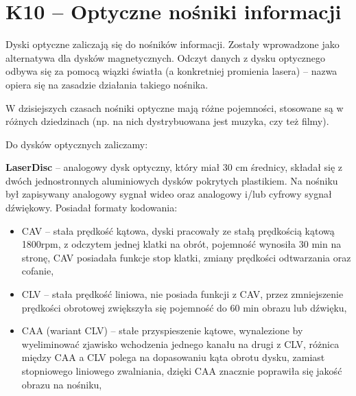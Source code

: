 \sloppy\section{K10 -- Optyczne nośniki informacji}

Dyski optyczne zaliczają się do nośników informacji. Zostały wprowadzone jako alternatywa dla dysków magnetycznych. Odczyt danych z dysku optycznego odbywa się za pomocą wiązki światła (a konkretniej promienia lasera) -- nazwa opiera się na zasadzie działania takiego nośnika.

W dzisiejszych czasach nośniki optyczne mają różne pojemności, stosowane są w różnych dziedzinach (np. na nich dystrybuowana jest muzyka, czy też filmy). 

Do dysków optycznych zaliczamy:

\textbf{LaserDisc} -- analogowy dysk optyczny, który miał 30 cm średnicy, składał się z dwóch jednostronnych aluminiowych dysków pokrytych plastikiem. Na nośniku był zapisywany analogowy sygnał wideo oraz analogowy i/lub cyfrowy sygnał dźwiękowy. Posiadał formaty kodowania:
\begin{itemize}
\item CAV -- stała prędkość kątowa, dyski pracowały ze stałą prędkością kątową 1800rpm, z odczytem jednej klatki na obrót, pojemność wynosiła 30 min na stronę, CAV posiadała funkcje stop klatki, zmiany prędkości odtwarzania oraz cofanie,
\item CLV -- stała prędkość liniowa, nie posiada funkcji z CAV, przez zmniejszenie prędkości obrotowej zwiększyła się pojemność do 60 min obrazu lub dźwięku,
\item CAA (wariant CLV) -- stałe przyspieszenie kątowe, wynalezione by wyeliminować zjawisko wchodzenia jednego kanału na drugi z CLV, różnica między CAA a CLV polega na dopasowaniu kąta obrotu dysku, zamiast stopniowego liniowego zwalniania, dzięki CAA znacznie poprawiła się jakość obrazu na nośniku,
\end{itemize}

